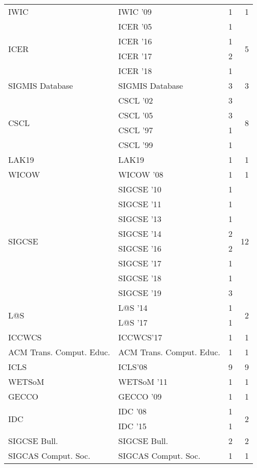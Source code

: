\begin{table*}[t]
\begin{tabular}{llrr}
\multirow{1}{*}{IWIC } & IWIC '09 & 1 & \multirow{1}{*}{1}\\
\multirow{4}{*}{ICER } & ICER '05 & 1 & \multirow{4}{*}{5}\\
& ICER '16 & 1 &\\
& ICER '17 & 2 &\\
& ICER '18 & 1 &\\
\multirow{1}{*}{SIGMIS Database} & SIGMIS Database & 3 & \multirow{1}{*}{3}\\
\multirow{4}{*}{CSCL } & CSCL '02 & 3 & \multirow{4}{*}{8}\\
& CSCL '05 & 3 &\\
& CSCL '97 & 1 &\\
& CSCL '99 & 1 &\\
\multirow{1}{*}{LAK19} & LAK19 & 1 & \multirow{1}{*}{1}\\
\multirow{1}{*}{WICOW } & WICOW '08 & 1 & \multirow{1}{*}{1}\\
\multirow{8}{*}{SIGCSE } & SIGCSE '10 & 1 & \multirow{8}{*}{12}\\
& SIGCSE '11 & 1 &\\
& SIGCSE '13 & 1 &\\
& SIGCSE '14 & 2 &\\
& SIGCSE '16 & 2 &\\
& SIGCSE '17 & 1 &\\
& SIGCSE '18 & 1 &\\
& SIGCSE '19 & 3 &\\
\multirow{2}{*}{L@S } & L@S '14 & 1 & \multirow{2}{*}{2}\\
& L@S '17 & 1 &\\
\multirow{1}{*}{ICCWCS} & ICCWCS'17 & 1 & \multirow{1}{*}{1}\\
\multirow{1}{*}{ACM Trans. Comput. Educ.} & ACM Trans. Comput. Educ. & 1 & \multirow{1}{*}{1}\\
\multirow{1}{*}{ICLS} & ICLS'08 & 9 & \multirow{1}{*}{9}\\
\multirow{1}{*}{WETSoM } & WETSoM '11 & 1 & \multirow{1}{*}{1}\\
\multirow{1}{*}{GECCO } & GECCO '09 & 1 & \multirow{1}{*}{1}\\
\multirow{2}{*}{IDC } & IDC '08 & 1 & \multirow{2}{*}{2}\\
& IDC '15 & 1 &\\
\multirow{1}{*}{SIGCSE Bull.} & SIGCSE Bull. & 2 & \multirow{1}{*}{2}\\
\multirow{1}{*}{SIGCAS Comput. Soc.} & SIGCAS Comput. Soc. & 1 & \multirow{1}{*}{1}\\

\end{tabular}
\end{table*}
